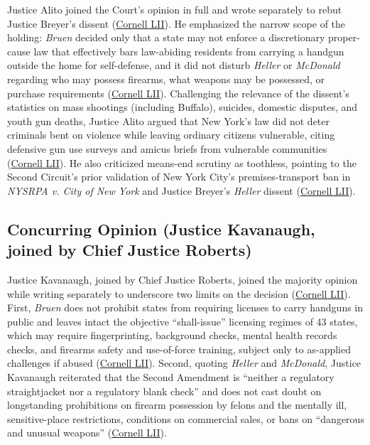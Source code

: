 \documentclass[12pt]{article}
\begin{document}
Justice Alito joined the Court's opinion in full and wrote separately to rebut Justice Breyer's dissent (\href{https://www.law.cornell.edu/supremecourt/text/20-843}{Cornell LII}). He emphasized the narrow scope of the holding: \textit{Bruen} decided only that a state may not enforce a discretionary proper-cause law that effectively bars law-abiding residents from carrying a handgun outside the home for self-defense, and it did not disturb \textit{Heller} or \textit{McDonald} regarding who may possess firearms, what weapons may be possessed, or purchase requirements (\href{https://www.law.cornell.edu/supremecourt/text/20-843}{Cornell LII}). Challenging the relevance of the dissent's statistics on mass shootings (including Buffalo), suicides, domestic disputes, and youth gun deaths, Justice Alito argued that New York's law did not deter criminals bent on violence while leaving ordinary citizens vulnerable, citing defensive gun use surveys and amicus briefs from vulnerable communities (\href{https://www.law.cornell.edu/supremecourt/text/20-843}{Cornell LII}). He also criticized means-end scrutiny as toothless, pointing to the Second Circuit's prior validation of New York City's premises-transport ban in \textit{NYSRPA v. City of New York} and Justice Breyer's \textit{Heller} dissent (\href{https://www.law.cornell.edu/supremecourt/text/20-843}{Cornell LII}).

\subsection{Concurring Opinion (Justice Kavanaugh, joined by Chief Justice Roberts)}

Justice Kavanaugh, joined by Chief Justice Roberts, joined the majority opinion while writing separately to underscore two limits on the decision (\href{https://www.law.cornell.edu/supremecourt/text/20-843}{Cornell LII}). First, \textit{Bruen} does not prohibit states from requiring licenses to carry handguns in public and leaves intact the objective ``shall-issue'' licensing regimes of 43 states, which may require fingerprinting, background checks, mental health records checks, and firearms safety and use-of-force training, subject only to as-applied challenges if abused (\href{https://www.law.cornell.edu/supremecourt/text/20-843}{Cornell LII}). Second, quoting \textit{Heller} and \textit{McDonald}, Justice Kavanaugh reiterated that the Second Amendment is ``neither a regulatory straightjacket nor a regulatory blank check'' and does not cast doubt on longstanding prohibitions on firearm possession by felons and the mentally ill, sensitive-place restrictions, conditions on commercial sales, or bans on ``dangerous and unusual weapons'' (\href{https://www.law.cornell.edu/supremecourt/text/20-843}{Cornell LII}).
\end{document}
